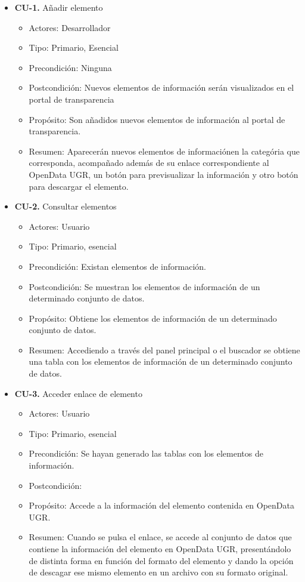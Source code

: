 \begin{itemize}
 \item \textbf{CU-1.} Añadir elemento
 \begin{itemize}
  \item Actores: Desarrollador
  \item Tipo: Primario, Esencial
  \item Precondición: Ninguna
  \item Postcondición: Nuevos elementos de información serán visualizados en el portal de transparencia
  \item Propósito: Son añadidos nuevos elementos de información al portal de transparencia.
  \item Resumen: Aparecerán nuevos elementos de informaciónen la categória que corresponda, acompañado además de su enlace
  correspondiente al OpenData UGR, un botón para previsualizar la información y otro botón para descargar el elemento.
 \end{itemize}
\end{itemize}

\begin{itemize}
 \item \textbf{CU-2.} Consultar elementos
 \begin{itemize}
  \item Actores: Usuario
  \item Tipo: Primario, esencial
  \item Precondición: Existan elementos de información.
  \item Postcondición: Se muestran los elementos de información de un determinado conjunto de datos.
  \item Propósito: Obtiene los elementos de información de un determinado conjunto de datos.
  \item Resumen: Accediendo a través del panel principal o el buscador se obtiene una tabla con los elementos de información
  de un determinado conjunto de datos.
 \end{itemize}
\end{itemize}

\begin{itemize}
 \item \textbf{CU-3.} Acceder enlace de elemento
 \begin{itemize}
  \item Actores: Usuario
  \item Tipo: Primario, esencial
  \item Precondición: Se hayan generado las tablas con los elementos de información.
  \item Postcondición: 
  \item Propósito: Accede a la información del elemento contenida en OpenData UGR.
  \item Resumen: Cuando se pulsa el enlace, se accede al conjunto de datos que contiene la información del elemento en OpenData
  UGR, presentándolo de distinta forma en función del formato del elemento y dando la opción de descagar ese mismo elemento en 
  un archivo con su formato original.
 \end{itemize}
\end{itemize}

